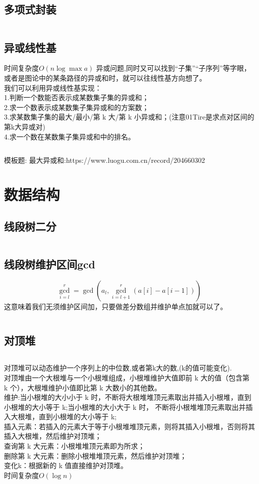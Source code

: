 \documentclass[a4paper]{report}
\newcommand{\cppcode}[1]{  
    \inputminted[mathescape]{cpp}{source/#1}  
}
\begin{document}
\section{多项式封装}
\cppcode{Ploy.cpp}

\section{异或线性基}
时间复杂度$O(n\log{\max{a}})$
异或问题,同时又可以找到“子集”“子序列”等字眼，或者是图论中的某条路径的异或和时，就可以往线性基方向想了。\\
我们可以利用异或线性基实现：\\
1.判断一个数能否表示成某数集子集的异或和；\\
2.求一个数表示成某数集子集异或和的方案数；\\
3.求某数集子集的最大/最小/第 k 大/第 k 小异或和；(注意01Tire是求点对区间的第k大异或对) \\
4.求一个数在某数集子集异或和中的排名。\\
\cppcode{basis.cpp}
模板题:
最大异或和:https://www.luogu.com.cn/record/204660302


\chapter{数据结构}
\section{线段树二分}
\cppcode{segment_tree.cpp}
\section{线段树维护区间gcd}
$$
\gcd_{i=l}^{r}=\gcd(a_l,\gcd_{i=l+1}^{r}(a[i]-a[i-1]))
$$
这意味着我们无须维护区间加，只要做差分数组并维护单点加就可以了。\\
\cppcode{segtgcd.cpp}

\section{对顶堆}
\cppcode{Maxheap.cpp}
对顶堆可以动态维护一个序列上的中位数,或者第k大的数,(k的值可能变化).\\
对顶堆由一个大根堆与一个小根堆组成，小根堆维护大值即前 k 大的值（包含第 k 个），大根堆维护小值即比第 k 大数小的其他数。\\
维护:当小根堆的大小小于 k 时，不断将大根堆堆顶元素取出并插入小根堆，直到小根堆的大小等于 k;当小根堆的大小大于 k 时，
不断将小根堆堆顶元素取出并插入大根堆，直到小根堆的大小等于 k;\\
插入元素：若插入的元素大于等于小根堆堆顶元素，则将其插入小根堆，否则将其插入大根堆，然后维护对顶堆；\\
查询第 k 大元素：小根堆堆顶元素即为所求；\\
删除第 k 大元素：删除小根堆堆顶元素，然后维护对顶堆；\\
变化k：根据新的 k 值直接维护对顶堆。\\
时间复杂度$O(\log{n})$
\cppcode{对顶堆.cpp}
\end{document}
